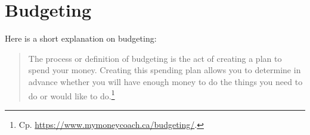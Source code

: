 \section{Budgeting}
\label{sec:budgeting}

Here is a short explanation on budgeting:
\begin{quote}\small
	The process or definition of budgeting is the act of creating a plan to spend your money.
	Creating this spending plan allows you to determine in advance whether you will have enough money to do the things you need to do or would like to do.\footnote{Cp. \url{https://www.mymoneycoach.ca/budgeting/}.}
\end{quote}






